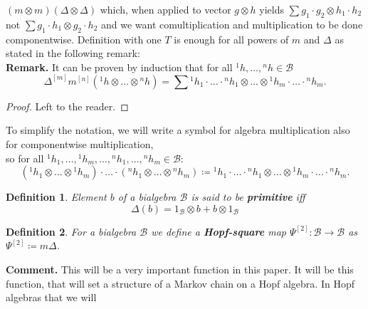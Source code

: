 \documentclass[a4paper, 12pt]{article}
\newtheorem{definition}{Definition}
\begin{document}
$(m \otimes m)(\Delta \otimes \Delta)$ which, when applied to vector $g \otimes h$ yields
$\displaystyle\sum g_1 \cdot g_2 \otimes h_1 \cdot h_2$ not $\sum g_1 \cdot h_1 \otimes g_2 \cdot h_2$
and we want comultiplication and multiplication to be done componentwise. Definition with
one $T$ is enough for all powers of $m$ and $\Delta$ as stated in the following remark:\\
\textbf{Remark. } It can be proven by induction that for all ${^1h}, \dots, {^nh} \in \mathcal{B}$
\begin{equation}
\Delta^{[m]}m^{[n]}({^1h} \otimes \dots \otimes {^nh}) = \sum {^1h}_1 \cdot \ldots \cdot {^nh}_1
\otimes \dots \otimes {^1h}_m\cdot  \ldots \cdot {^nh}_m.
\end{equation}
\begin{proof}
Left to the reader.
\end{proof}
To simplify the notation, we will write a symbol for algebra multiplication also for componentwise
multiplication, \\ so for all ${^1h}_1, \dots, {^1h}_m, \dots, {^nh}_1, \dots , {^nh}_m \in \mathcal{B}$:
\begin{equation}
({^1h}_1\otimes \dots \otimes {^1h}_m)\cdot \ldots \cdot ({^nh}_1 \otimes \dots \otimes {^nh}_m) \coloneqq
{^1h}_1 \cdot \ldots \cdot {^nh}_1 \otimes \dots \otimes {^1h}_m\cdot  \ldots \cdot {^nh}_m.
\end{equation}
\begin{definition}
Element $b$ of a bialgebra $\mathcal{B}$ is said to be \textbf{primitive} iff
\begin{equation*}
\Delta(b) = 1_\mathcal{B} \otimes b + b \otimes 1_\mathcal{B}
\end{equation*}
\end{definition}
\begin{definition}
For a bialgebra $\mathcal{B}$ we define a \textbf{Hopf-square} map
$\Psi^{[2]} : \mathcal{B} \to \mathcal{B}$ as $\Psi^{[2]} \coloneqq m\Delta$.
\end{definition}
\textbf{Comment. } This will be a very important function in this paper. It will be this function, that will
set a structure
of a Markov chain on a Hopf algebra. In Hopf algebras that we will
\end{document}

